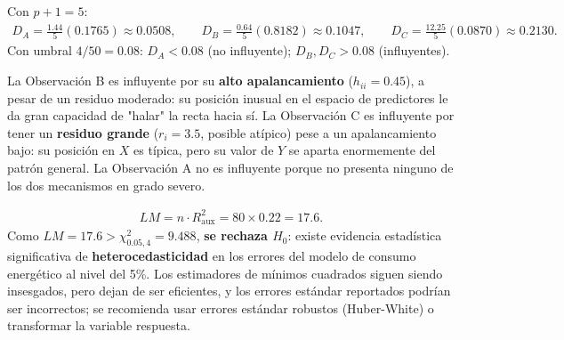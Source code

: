 \begin{solproblema}[prob:dc2ca7b]
	Con $p+1=5$:
	\begin{align}
		D_A = \frac{1.44}{5}(0.1765) \approx 0.0508, \qquad D_B = \frac{0.64}{5}(0.8182) \approx 0.1047, \qquad D_C = \frac{12.25}{5}(0.0870) \approx 0.2130.
	\end{align}
	Con umbral $4/50=0.08$: $D_A<0.08$ (no influyente); $D_B, D_C>0.08$ (influyentes).

	La Observación B es influyente por su \textbf{alto apalancamiento} ($h_{ii}=0.45$), a pesar de un residuo moderado: su posición inusual en el espacio de predictores le da gran capacidad de "halar" la recta hacia sí. La Observación C es influyente por tener un \textbf{residuo grande} ($r_i=3.5$, posible atípico) pese a un apalancamiento bajo: su posición en $X$ es típica, pero su valor de $Y$ se aparta enormemente del patrón general. La Observación A no es influyente porque no presenta ninguno de los dos mecanismos en grado severo.
\end{solproblema}

\begin{solproblema}[prob:f0b580a]
	\begin{align}
		LM = n \cdot R_{\text{aux}}^2 = 80 \times 0.22 = 17.6.
	\end{align}
	Como $LM = 17.6 > \chi^2_{0.05,4} = 9.488$, \textbf{se rechaza $H_0$}: existe evidencia estadística significativa de \textbf{heterocedasticidad} en los errores del modelo de consumo energético al nivel del 5\%. Los estimadores de mínimos cuadrados siguen siendo insesgados, pero dejan de ser eficientes, y los errores estándar reportados podrían ser incorrectos; se recomienda usar errores estándar robustos (Huber-White) o transformar la variable respuesta.
\end{solproblema}

